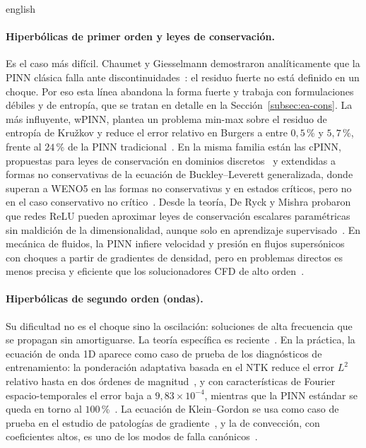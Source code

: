 \documentclass[../0000.tex]{subfiles}
\begin{document}
\begin{hyphenrules}{english}
\paragraph{Hiperbólicas de primer orden y leyes de conservación.} Es el caso más difícil. Chaumet y Giesselmann demostraron analíticamente que la PINN clásica falla ante discontinuidades~\cite{chaumet2024improving}: el residuo fuerte no está definido en un choque. Por eso esta línea abandona la forma fuerte y trabaja con formulaciones débiles y de entropía, que se tratan en detalle en la Sección~\ref{subsec:ea-cons}. La más influyente, wPINN, plantea un problema min-max sobre el residuo de entropía de Kružkov y reduce el error relativo en Burgers a entre $0{,}5$\,\% y $5{,}7$\,\%, frente al $24$\,\% de la PINN tradicional~\cite{deryck2024wpinn}. En la misma familia están las cPINN, propuestas para leyes de conservación en dominios discretos~\cite{jagtap2020conservative} y extendidas a formas no conservativas de la ecuación de Buckley--Leverett generalizada, donde superan a WENO5 en las formas no conservativas y en estados críticos, pero no en el caso conservativo no crítico~\cite{quita2023conservative}. Desde la teoría, De Ryck y Mishra probaron que redes ReLU pueden aproximar leyes de conservación escalares paramétricas sin maldición de la dimensionalidad, aunque solo en aprendizaje supervisado~\cite{de2024error}. En mecánica de fluidos, la PINN infiere velocidad y presión en flujos supersónicos con choques a partir de gradientes de densidad, pero en problemas directos es menos precisa y eficiente que los solucionadores CFD de alto orden~\cite{cai2021physics}.

\paragraph{Hiperbólicas de segundo orden (ondas).} Su dificultad no es el choque sino la oscilación: soluciones de alta frecuencia que se propagan sin amortiguarse. La teoría específica es reciente~\cite{qian2023}. En la práctica, la ecuación de onda 1D aparece como caso de prueba de los diagnósticos de entrenamiento: la ponderación adaptativa basada en el NTK reduce el error $L^2$ relativo hasta en dos órdenes de magnitud~\cite{wang2022ntk}, y con características de Fourier espacio-temporales el error baja a $9{,}83\times10^{-4}$, mientras que la PINN estándar se queda en torno al $100$\,\%~\cite{wang2021eigenvector}. La ecuación de Klein--Gordon se usa como caso de prueba en el estudio de patologías de gradiente~\cite{wang2021gradient}, y la de convección, con coeficientes altos, es uno de los modos de falla canónicos~\cite{krishnapriyan2021,rathore2024challenges}.


\end{hyphenrules}
\end{document}
